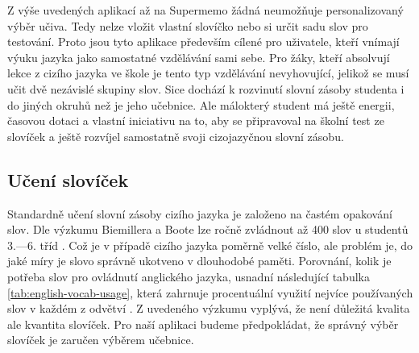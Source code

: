 \documentclass[a4paper,11pt,titlepage,fleqn]{article}
\begin{document}


        Z výše uvedených aplikací až na Supermemo žádná neumožňuje personalizovaný výběr učiva. Tedy nelze vložit vlastní slovíčko nebo si určit sadu slov pro testování. Proto jsou tyto aplikace především cílené pro uživatele, kteří vnímají výuku jazyka jako samostatné vzdělávání sami sebe. Pro žáky, kteří absolvují lekce z cizího jazyka ve škole je tento typ vzdělávání nevyhovující, jelikož se musí učit dvě nezávislé skupiny slov. Sice dochází k rozvinutí slovní zásoby studenta i do jiných okruhů než je jeho učebnice. Ale málokterý student má ještě energii, časovou dotaci a vlastní iniciativu na to, aby se připravoval na školní test ze slovíček a ještě rozvíjel samostatně svoji cizojazyčnou slovní zásobu.

    \subsection{Učení slovíček}
        Standardně učení slovní zásoby cizího jazyka je založeno na častém opakování slov. Dle výzkumu Biemillera a Boote lze ročně zvládnout až 400 slov u studentů 3.—6. tříd \cite{bib:beimiller}. Což je v případě cizího jazyka poměrně velké číslo, ale problém je, do jaké míry je slovo správně ukotveno v dlouhodobé paměti. Porovnání, kolik je potřeba slov pro ovládnutí anglického jazyka, usnadní následující tabulka \ref{tab:english-vocab-usage}, která zahrnuje procentuální využití nejvíce používaných slov v každém z odvětví \cite{bib:learning-vocab}. Z uvedeného výzkumu vyplývá, že není důležitá kvalita ale kvantita slovíček. Pro naší aplikaci budeme předpokládat, že správný výběr slovíček je zaručen výběrem učebnice.

\end{document}
